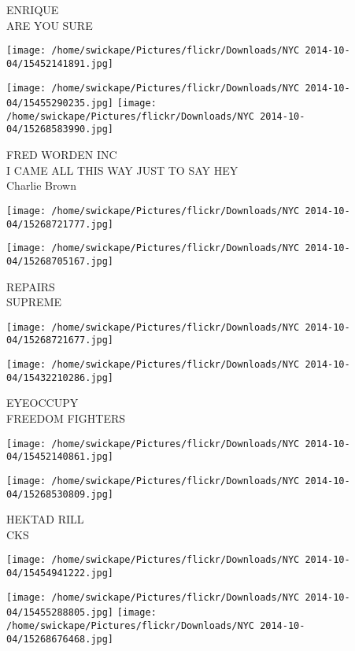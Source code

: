 \documentclass[10pt,letterpaper]{article}
\begin{document}
ENRIQUE\\
ARE YOU SURE\\
\pagebreak

\texttt{[image: /home/swickape/Pictures/flickr/Downloads/NYC 2014-10-04/15452141891.jpg]}

\vspace{0.25in}
\texttt{[image: /home/swickape/Pictures/flickr/Downloads/NYC 2014-10-04/15455290235.jpg]}
\texttt{[image: /home/swickape/Pictures/flickr/Downloads/NYC 2014-10-04/15268583990.jpg]}

FRED WORDEN INC\\
I CAME ALL THIS WAY JUST TO SAY HEY\\
Charlie Brown\\
\pagebreak

\texttt{[image: /home/swickape/Pictures/flickr/Downloads/NYC 2014-10-04/15268721777.jpg]}

\vspace{0.25in}
\texttt{[image: /home/swickape/Pictures/flickr/Downloads/NYC 2014-10-04/15268705167.jpg]}

REPAIRS\\
SUPREME\\
\pagebreak

\texttt{[image: /home/swickape/Pictures/flickr/Downloads/NYC 2014-10-04/15268721677.jpg]}

\vspace{0.25in}
\texttt{[image: /home/swickape/Pictures/flickr/Downloads/NYC 2014-10-04/15432210286.jpg]}

EYEOCCUPY\\
FREEDOM FIGHTERS\\
\pagebreak

\texttt{[image: /home/swickape/Pictures/flickr/Downloads/NYC 2014-10-04/15452140861.jpg]}

\vspace{0.25in}
\texttt{[image: /home/swickape/Pictures/flickr/Downloads/NYC 2014-10-04/15268530809.jpg]}

HEKTAD RILL\\
CKS\\
\pagebreak

\texttt{[image: /home/swickape/Pictures/flickr/Downloads/NYC 2014-10-04/15454941222.jpg]}

\vspace{0.25in}
\texttt{[image: /home/swickape/Pictures/flickr/Downloads/NYC 2014-10-04/15455288805.jpg]}
\texttt{[image: /home/swickape/Pictures/flickr/Downloads/NYC 2014-10-04/15268676468.jpg]}
\end{document}
